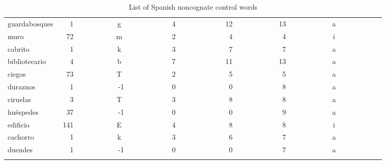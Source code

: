 \begin{longtable}{|l|c|c|c|c|c|c|}
guardabosques&~~1~~~~~~~~~~&g~~~~~~~~~~~~&4~~~~~~~~~~~~&12~~~~~~~~~~~&13~~~~~~~~~~~&a~~~~~~~~~~~~\\ 
muro~~~~~~~~~&~72~~~~~~~~~~&m~~~~~~~~~~~~&2~~~~~~~~~~~~&~4~~~~~~~~~~~&~4~~~~~~~~~~~&i~~~~~~~~~~~~\\ 
cabrito~~~~~~&~~1~~~~~~~~~~&k~~~~~~~~~~~~&3~~~~~~~~~~~~&~7~~~~~~~~~~~&~7~~~~~~~~~~~&a~~~~~~~~~~~~\\ 
bibliotecario&~~4~~~~~~~~~~&b~~~~~~~~~~~~&7~~~~~~~~~~~~&11~~~~~~~~~~~&13~~~~~~~~~~~&a~~~~~~~~~~~~\\ 
ciegos~~~~~~~&~73~~~~~~~~~~&T~~~~~~~~~~~~&2~~~~~~~~~~~~&~5~~~~~~~~~~~&~5~~~~~~~~~~~&a~~~~~~~~~~~~\\ 
duraznos~~~~~&~~1~~~~~~~~~~&-1~~~~~~~~~~~&0~~~~~~~~~~~~&~0~~~~~~~~~~~&~8~~~~~~~~~~~&a~~~~~~~~~~~~\\ 
ciruelas~~~~~&~~3~~~~~~~~~~&T~~~~~~~~~~~~&3~~~~~~~~~~~~&~8~~~~~~~~~~~&~8~~~~~~~~~~~&a~~~~~~~~~~~~\\ 
hu\'{e}spedes~~~~&~37~~~~~~~~~~&-1~~~~~~~~~~~&0~~~~~~~~~~~~&~0~~~~~~~~~~~&~9~~~~~~~~~~~&a~~~~~~~~~~~~\\ 
edificio~~~~~&141~~~~~~~~~~&E~~~~~~~~~~~~&4~~~~~~~~~~~~&~8~~~~~~~~~~~&~8~~~~~~~~~~~&i~~~~~~~~~~~~\\ 
cachorro~~~~~&~~1~~~~~~~~~~&k~~~~~~~~~~~~&3~~~~~~~~~~~~&~6~~~~~~~~~~~&~7~~~~~~~~~~~&a~~~~~~~~~~~~\\ 
duendes~~~~~~&~~1~~~~~~~~~~&-1~~~~~~~~~~~&0~~~~~~~~~~~~&~0~~~~~~~~~~~&~7~~~~~~~~~~~&a~~~~~~~~~~~~\\ 
\hline
\caption{List of Spanish noncognate control words}\label{span_controls}
\end{longtable}
